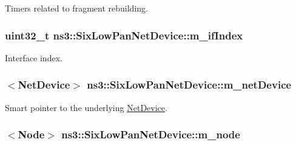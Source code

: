Timers related to fragment rebuilding. 

\subsubsection[{\texorpdfstring{m\+\_\+if\+Index}{m_ifIndex}}]{\setlength{\rightskip}{0pt plus 5cm}uint32\+\_\+t ns3\+::\+Six\+Low\+Pan\+Net\+Device\+::m\+\_\+if\+Index\hspace{0.3cm}{\ttfamily [private]}}\hypertarget{classns3_1_1SixLowPanNetDevice_ab07b4be5672c71fc3c069c3d5b44e75f}{}\label{classns3_1_1SixLowPanNetDevice_ab07b4be5672c71fc3c069c3d5b44e75f}


Interface index. 

\subsubsection[{\texorpdfstring{m\+\_\+net\+Device}{m_netDevice}}]{$<${\bf Net\+Device}$>$ ns3\+::\+Six\+Low\+Pan\+Net\+Device\+::m\+\_\+net\+Device\hspace{0.3cm}{\ttfamily [private]}}\hypertarget{classns3_1_1SixLowPanNetDevice_a758b615a8b8f811ae3517ab9c7574f7b}{}\label{classns3_1_1SixLowPanNetDevice_a758b615a8b8f811ae3517ab9c7574f7b}


Smart pointer to the underlying \hyperlink{classns3_1_1NetDevice}{Net\+Device}. 

\subsubsection[{\texorpdfstring{m\+\_\+node}{m_node}}]{$<${\bf Node}$>$ ns3\+::\+Six\+Low\+Pan\+Net\+Device\+::m\+\_\+node\hspace{0.3cm}{\ttfamily [private]}}\hypertarget{classns3_1_1SixLowPanNetDevice_a3f287ff63be440ab2978697b1d9b26a5}{}\label{classns3_1_1SixLowPanNetDevice_a3f287ff63be440ab2978697b1d9b26a5}


